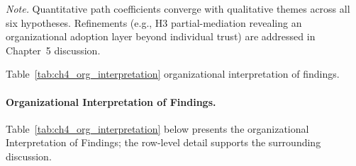\vspace{0.4em}
\noindent\textit{Note.} Quantitative path coefficients converge with qualitative themes across all six hypotheses. Refinements (e.g., H3 partial-mediation revealing an organizational adoption layer beyond individual trust) are addressed in Chapter~5 discussion.

\noindent Table~\ref{tab:ch4_org_interpretation} organizational interpretation of findings.

\paragraph{Organizational Interpretation of Findings.}


\noindent Table~\ref{tab:ch4_org_interpretation} below presents the organizational Interpretation of Findings; the row-level detail supports the surrounding discussion.

